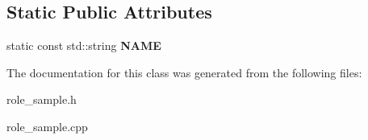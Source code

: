 \subsection*{Static Public Attributes}
\begin{DoxyCompactItemize}
\item 
\hypertarget{classRoleSample_a888e41a5266b3c98eb70ef6122ba8ce2}{
static const std::string {\bfseries NAME}}
\label{classRoleSample_a888e41a5266b3c98eb70ef6122ba8ce2}

\end{DoxyCompactItemize}


The documentation for this class was generated from the following files:\begin{DoxyCompactItemize}
\item 
role\_\-sample.h\item 
role\_\-sample.cpp\end{DoxyCompactItemize}
